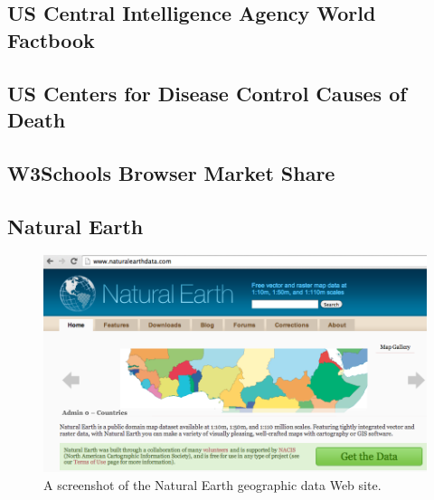\subsection{US Central Intelligence Agency World Factbook}
\subsection{US Centers for Disease Control Causes of Death}
\subsection{W3Schools Browser Market Share}
\subsection{Natural Earth}
\begin{figure}[h]
  \caption{A screenshot of the Natural Earth geographic data Web site.}
  \centering
  \includegraphics[width=\textwidth]{figures/naturalEarth.png}
\end{figure}
